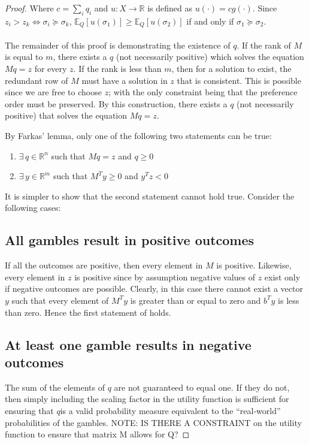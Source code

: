 \documentclass{article}
\begin{document}
\begin{proof}
Where \(c=\sum_i q_i\) and \(u:X \to \mathbb{R}\) is defined as \( u(\cdot)=c g(\cdot)\). Since \(z_i > z_k \Leftrightarrow \sigma_i \succeq \sigma_k\), \(\mathbb{E}_Q\left[u(\sigma_1)\right] \geq \mathbb{E}_Q\left[u(\sigma_2)\right]\) if and only if \(\sigma_1 \succeq \sigma_2\).  
\\
\\
The remainder of this proof is demonstrating the existence of \(q\).  If the rank of \(M\) is equal to \(m\), there exists a \(q\) (not necessarily positive) which solves the equation \(Mq=z\) for every \(z\).  If the rank is less than \(m\), then for a solution to exist, the redundant row of \(M\) must have a solution in \(z\) that is consistent.  This is possible since we are free to choose \(z\); with the only constraint being that the preference order must be preserved. By this construction, there exists a \(q\) (not necessarily positive) that solves the equation \(Mq=z\).  




By Farkas' lemma, only one of the following two statements can be true:

\begin{enumerate}
	\item \(\exists \,q \in \mathbb{R}^n\) such that \(Mq=z\) and \(q\geq 0\)
	\item \(\exists \,y \in \mathbb{R}^m\) such that \(M^T y \geq 0 \) and \(y^T z <0\)
\end{enumerate}

It is simpler to show that the second statement cannot hold true.  Consider the following cases:

\subsection{All gambles result in positive outcomes}

If all the outcomes are positive, then every element in \(M\) is positive.  Likewise, every element in \(z\) is positive since by assumption negative values of \(z\) exist only if negative outcomes are possible.  Clearly, in this case there cannot exist a vector \(y\) such that every element of \(M^T y\) is greater than or equal to zero and \(b^T y\) is less than zero.  Hence the first statement of holds.

\subsection{At least one gamble results in negative outcomes}




The sum of the elements of \(q\) are not guaranteed to equal one.  If they do not, then simply including the scaling factor in the utility function is sufficient for ensuring that \(q\)is a valid probability measure equivalent to the ``real-world'' probabilities of the gambles.  NOTE: IS THERE A CONSTRAINT on the utility function to ensure that matrix M allows for Q?


\end{proof}
\end{document}
